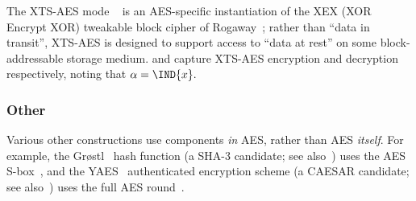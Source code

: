 The XTS-AES mode 
~\cite{NIST:sp.800.38e}
is an AES-specific instantiation of the XEX (XOR Encrypt XOR) tweakable
block cipher of Rogaway~\cite{Rogaway:04};
rather than ``data in transit'', XTS-AES is designed to support access
to ``data at rest'' on some block-addressable storage medium.
and
capture XTS-AES encryption and decryption respectively, noting that 
$
\alpha = \IND{x} .
$


\subsubsection{Other}

Various other constructions use components {\em in} AES, rather than AES
{\em itself}.
For example,
the Gr{\o}stl~\cite{GKMMRST:11} hash function
(a SHA-3  candidate; see also~\cite{BBGR:09})
uses the AES S-box~\cite[Section 4.3]{GKMMRST:11},
and
the YAES~\cite{BosVer:14} authenticated encryption scheme
(a CAESAR candidate; see also~\cite[Section 4.1]{AnkAnk:16})
uses the full AES round~\cite[Section 1.3]{BosVer:14}.

